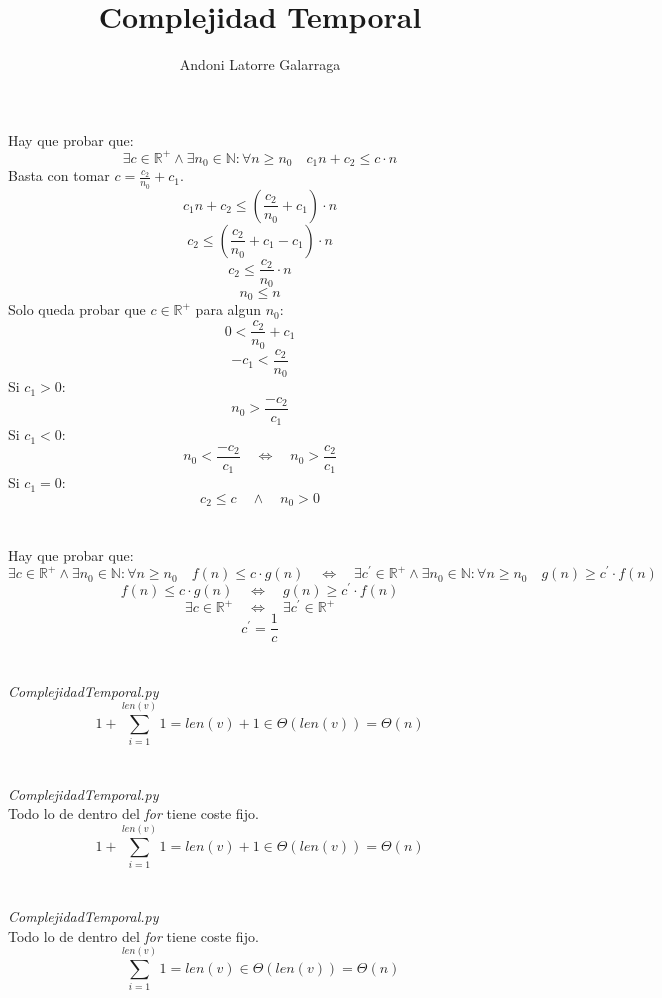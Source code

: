 \documentclass{article}
\title{Complejidad Temporal}
\author{Andoni Latorre Galarraga}
\date{}
\begin{document}
\maketitle

\section{}
Hay que probar que:
$$
\exists c \in \mathbb{R}^+ \land \exists n_0 \in \mathbb{N} : \forall n \ge n_0 \quad c_1 n + c_2 \le c \cdot n
$$
Basta con tomar $c = \frac{c_2}{n_0} + c_1$.
$$
c_1 n + c_2 \le ( \frac{c_2}{n_0} + c_1 ) \cdot n
$$
$$
c_2 \le ( \frac{c_2}{n_0} + c_1 - c_1 ) \cdot n
$$
$$
c_2 \le \frac{c_2}{n_0} \cdot n
$$
$$
n_0 \le n
$$
Solo queda probar que $c \in \mathbb{R}^+$ para algun $n_0$:
$$
0 < \frac{c_2}{n_0} + c_1
$$
$$
- c_1 < \frac{c_2}{n_0} 
$$
Si $c_1 > 0$:
$$
n_0 > \frac{-c_2}{c_1}
$$
Si $c_1 < 0$:
$$
n_0 < \frac{-c_2}{c_1} \quad \Leftrightarrow \quad n_0 > \frac{c_2}{c_1}
$$
Si $c_1 = 0$:
$$
c_2 \le c \quad \land \quad n_0 > 0
$$
\section{}
Hay que probar que:
$$
\exists c \in \mathbb{R}^+ \land \exists n_0 \in \mathbb{N} : \forall n \ge n_0 \quad f(n) \le c \cdot g(n) \quad \Leftrightarrow \quad \exists c^\prime \in \mathbb{R}^+ \land \exists n_0 \in \mathbb{N} : \forall n \ge n_0 \quad g(n) \ge c^\prime \cdot f(n)
$$
$$
f(n) \le c \cdot g(n) \quad \Leftrightarrow \quad g(n) \ge c^\prime \cdot f(n)
$$
$$
\exists c \in \mathbb{R}^+ \quad \Leftrightarrow \quad \exists c^\prime \in \mathbb{R}^+
$$
$$
c^\prime = \frac{1}{c}
$$
\section{}
\textit{ComplejidadTemporal.py}
$$
1 + \sum_{i=1}^{len(v)} 1 = len(v) + 1 \in \Theta (len(v)) = \Theta (n)
$$
\section{}
\textit{ComplejidadTemporal.py}\\
Todo lo de dentro del \textit{for} tiene coste fijo.
$$
1 + \sum_{i=1}^{len(v)} 1 = len(v) + 1 \in \Theta (len(v)) = \Theta (n)
$$
\section{}
\textit{ComplejidadTemporal.py}\\
Todo lo de dentro del \textit{for} tiene coste fijo.
$$
\sum_{i=1}^{len(v)} 1 = len(v) \in \Theta (len(v)) = \Theta (n)
$$
\end{document}
